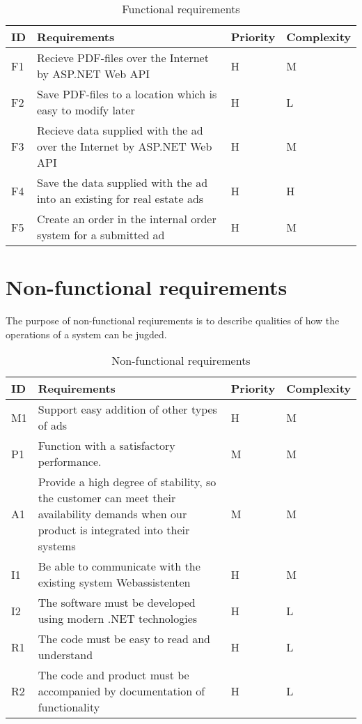\begin{table}[H]
\begin{tabular}{|p{1.5cm}|p{8cm}|p{2cm}|p{3cm}|}
	\hline
	\textbf{ID} & \textbf{Requirements} & \textbf{Priority} & \textbf{Complexity}\\
	\hline F1 & Recieve PDF-files over the Internet by ASP.NET Web API & H & M \\
	\hline
	F2 & Save PDF-files to a location which is easy to modify later & H & L \\
	\hline
	F3 & Recieve data supplied with the ad over the Internet by ASP.NET Web API & H & M \\
	\hline
	F4 & Save the data supplied with the ad into an existing for real estate ads & H & H \\
	\hline
	F5 & Create an order in the internal order system for a submitted ad & H & M \\
	\hline
	
\end{tabular}
\caption{Functional requirements}
\end{table}

\section{Non-functional requirements} 
The purpose of non-functional reqiurements is to describe qualities of how the operations of a system can be jugded. 

\normalsize
\begin{table}[H]
\begin{tabular}{|p{1.5cm}|p{8cm}|p{2cm}|p{3cm}|}
	\hline
	\textbf{ID} & \textbf{Requirements} & \textbf{Priority} & \textbf{Complexity}\\
	\hline
	M1 & Support easy addition of other types of ads & H & M \\
	\hline
	P1 & Function with a satisfactory performance. & M & M \\
	\hline
	A1 & Provide a high degree of stability, so the customer can meet their availability demands when our product is integrated into their systems & M & M\\
	\hline
	I1 & Be able to communicate with the existing system Webassistenten & H & M \\
	\hline
	I2 & The software must be developed using modern .NET technologies & H & L \\
	\hline
	R1 & The code must be easy to read and understand & H & L \\ 
	\hline
	R2 & The code and product must be accompanied by documentation of functionality & H & L \\
	\hline
	
	
\end{tabular}
\caption{Non-functional requirements}
\end{table}